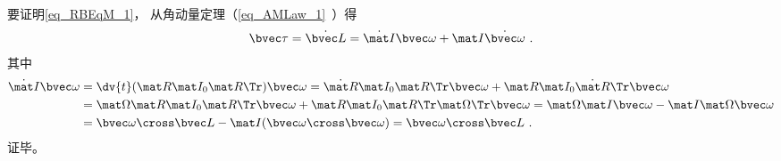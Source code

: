 要证明\autoref{eq_RBEqM_1}， 从角动量定理（\autoref{eq_AMLaw_1}~）得
\begin{equation}\label{eq_RBEqM_3}
\bvec \tau = \dot{\bvec L} = \dot{\mat I} \bvec\omega + \mat I \dot{\bvec\omega}~.
\end{equation}
其中
\begin{equation}
\begin{aligned}
\dot{\mat I}\bvec\omega &= \dv{t}(\mat R \mat I_0 \mat R\Tr)\bvec\omega
= \dot{\mat R} \mat I_0 \mat R\Tr \bvec\omega + \mat R \mat I_0 \dot{\mat R}\Tr \bvec\omega\\
&= \mat \Omega \mat R \mat I_0 \mat R\Tr \bvec\omega + \mat R \mat I_0 \mat R\Tr \mat \Omega\Tr \bvec\omega
= \mat \Omega \mat I \bvec\omega - \mat I \mat \Omega \bvec\omega\\
&= \bvec \omega \cross \bvec L - \mat I (\bvec\omega\cross\bvec\omega)
= \bvec \omega \cross \bvec L~.
\end{aligned}
\end{equation}
证毕。

